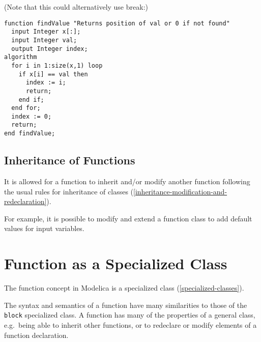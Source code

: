 \begin{example}
(Note that this could alternatively use break:)
\begin{lstlisting}[language=modelica]
function findValue "Returns position of val or 0 if not found"
  input Integer x[:];
  input Integer val;
  output Integer index;
algorithm
  for i in 1:size(x,1) loop
    if x[i] == val then
      index := i;
      return;
    end if;
  end for;
  index := 0;
  return;
end findValue;
\end{lstlisting}
\end{example}

\subsection{Inheritance of Functions}

It is allowed for a function to inherit and/or modify another function
following the usual rules for inheritance of classes (\autoref{inheritance-modification-and-redeclaration}).

\begin{nonnormative}
For example, it is possible to modify and extend a function class to add default values for input variables.
\end{nonnormative}

\section{Function as a Specialized Class}

The function concept in Modelica is a specialized class (\autoref{specialized-classes}).

\begin{nonnormative}
The syntax and semantics of a function have many similarities to those of the \lstinline!block! specialized class. A function has many of the properties
of a general class, e.g.\ being able to inherit other functions, or to redeclare or modify elements of a function declaration.
\end{nonnormative}

